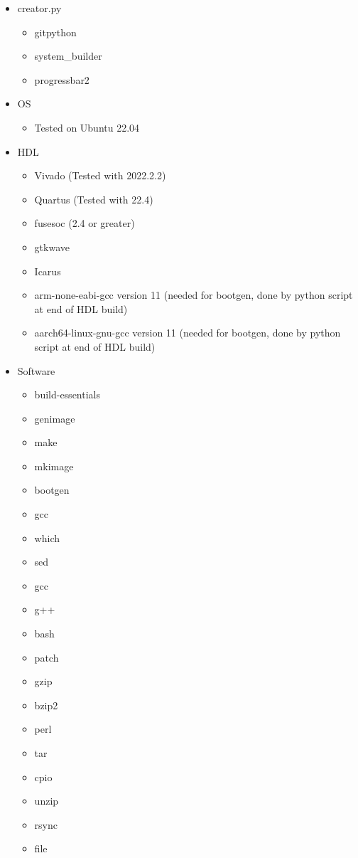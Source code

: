 \begin{itemize}
\item creator.py
  \begin{itemize}
  \item gitpython
  \item system\_builder
  \item progressbar2
  \end{itemize}
\item OS
  \begin{itemize}
  \item Tested on Ubuntu 22.04
  \end{itemize}
\item HDL
  \begin{itemize}
  \item Vivado (Tested with 2022.2.2)
  \item Quartus (Tested with 22.4)
  \item fusesoc (2.4 or greater)
  \item gtkwave
  \item Icarus
  \item arm-none-eabi-gcc version 11 (needed for bootgen, done by python script at end of HDL build)
  \item aarch64-linux-gnu-gcc  version 11 (needed for bootgen, done by python script at end of HDL build)
  \end{itemize}
\item Software
  \begin{itemize}
  \item build-essentials
  \item genimage
  \item make
  \item mkimage
  \item bootgen
  \item gcc
  \item which
  \item sed
  \item gcc
  \item g++
  \item bash
  \item patch
  \item gzip
  \item bzip2
  \item perl
  \item tar
  \item cpio
  \item unzip
  \item rsync
  \item file

\end{itemize}
\end{itemize}
